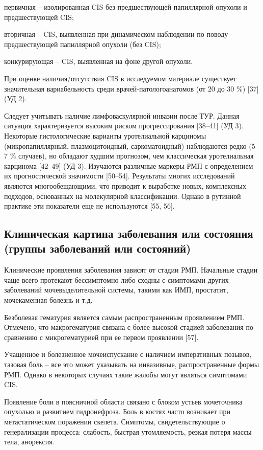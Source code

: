первичная – изолированная CIS без предшествующей папиллярной опухоли и предшествующей CIS;

вторичная – CIS, выявленная при динамическом наблюдении по поводу предшествующей папиллярной опухоли (без CIS);

конкурирующая – CIS, выявленная на фоне другой опухоли.

При оценке наличия/отсутствия CIS в исследуемом материале существует значительная вариабельность среди врачей-патологоанатомов (от 20 до 30 \%) [37] (УД 2).

Следует учитывать наличие лимфоваскулярной инвазии после ТУР. Данная ситуация характеризуется высоким риском прогрессирования [38–41] (УД 3). Некоторые гистологические варианты уротелиальной карциномы (микропапиллярный, плазмоцитоидный, саркоматоидный) наблюдаются редко (5–7 \% случаев), но обладают худшим прогнозом, чем классическая уротелиальная карцинома [42–49] (УД 3). Изучаются различные маркеры РМП с определением их прогностической значимости [50–54]. Результаты многих исследований являются многообещающими, что приводит к выработке новых, комплексных подходов, основанных на молекулярной классификации. Однако в рутинной практике эти показатели еще не используются [55, 56].

\subsection{Клиническая картина заболевания или состояния (группы заболеваний или состояний)}
\label{sec:}
Клинические проявления заболевания зависят от стадии РМП. Начальные стадии чаще всего протекают бессимптомно либо сходны с симптомами других заболеваний мочевыделительной системы, такими как ИМП, простатит, мочекаменная болезнь и т.д.

Безболевая гематурия является самым распространенным проявлением РМП. Отмечено, что макрогематурия связана с более высокой стадией заболевания по сравнению с микрогематурией при ее первом проявлении [57].

Учащенное и болезненное мочеиспускание с наличием императивных позывов, тазовая боль – все это может указывать на инвазивные, распространенные формы РМП. Однако в некоторых случаях такие жалобы могут являться симптомами CIS.

Появление боли в поясничной области связано с блоком устьев мочеточника опухолью и развитием гидронефроза. Боль в костях часто возникает при метастатическом поражении скелета. Симптомы, свидетельствующие о генерализации процесса: слабость, быстрая утомляемость, резкая потеря массы тела, анорексия.
